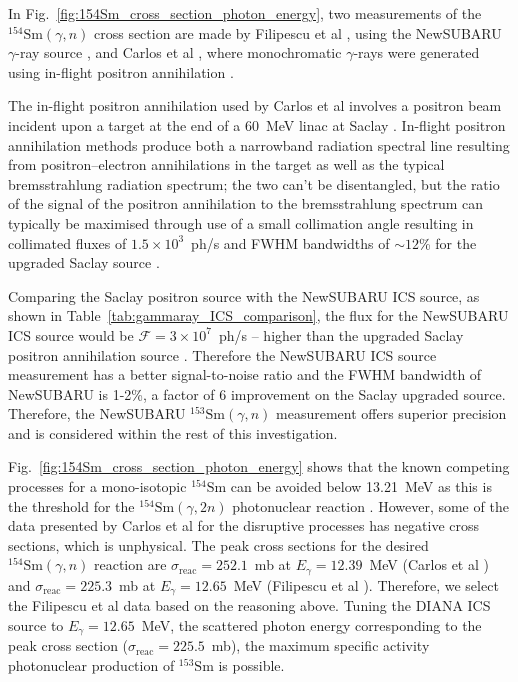\documentclass[../main.tex]{subfiles}
\begin{document}
In Fig.~\ref{fig:154Sm_cross_section_photon_energy}, two measurements of the $^{154}\mathrm{Sm}\left(\gamma,n\right)$ cross section are made by Filipescu et al \cite{filipescu2014photoneutron}, using the NewSUBARU $\gamma$-ray source \cite{utsunomiya2015gamma}, and Carlos et al \cite{carlos1974giant}, where monochromatic $\gamma$-rays were generated using in-flight positron annihilation \cite{miller1960monochromatic}.

The in-flight positron annihilation used by Carlos et al involves a positron beam incident upon a target at the end of a 60~\si{\mega\electronvolt} linac at Saclay \cite{audit1970etude}. In-flight positron annihilation methods produce both a narrowband radiation spectral line resulting from positron--electron annihilations in the target as well as the typical bremsstrahlung radiation spectrum; the two can't be disentangled, but the ratio of the signal of the positron annihilation to the bremsstrahlung spectrum can typically be maximised through use of a small collimation angle resulting in collimated fluxes of $1.5\times10^{3}$~ph/\si{\second} and FWHM bandwidths of $\sim 12$\% for the upgraded Saclay source \cite{veyssiere1979quasi}.

Comparing the Saclay positron source with the NewSUBARU ICS source, as shown in Table~\ref{tab:gammaray_ICS_comparison}, the flux for the NewSUBARU ICS source would be $\mathcal{F}=3\times 10^{7}$~ph/\si{\second} -- higher than the upgraded Saclay positron annihilation source \cite{veyssiere1979quasi}. Therefore the NewSUBARU ICS source measurement has a better signal-to-noise ratio and the FWHM bandwidth of NewSUBARU is 1-2\%, a factor of 6 improvement on the Saclay upgraded source. Therefore, the NewSUBARU $^{153}\mathrm{Sm}\left(\gamma,n\right)$ measurement offers superior precision and is considered within the rest of this investigation.  

Fig.~\ref{fig:154Sm_cross_section_photon_energy} shows that the known competing processes for a mono-isotopic $^{154}\mathrm{Sm}$ can be avoided below 13.21~\si{\mega\electronvolt} as this is the threshold for the $^{154}\mathrm{Sm}\left(\gamma,2n\right)$ photonuclear reaction \cite{carlos1974giant}. However, some of the data presented by Carlos et al \cite{carlos1974giant} for the disruptive processes has negative cross sections, which is unphysical. The peak cross sections for the desired $^{154}\mathrm{Sm}\left(\gamma,n\right)$ reaction are $\sigma_{\mathrm{reac}} = 252.1$~\si{\milli\barn} at $E_{\gamma} = 12.39$~\si{\mega\electronvolt} (Carlos et al \cite{carlos1974giant}) and $\sigma_{\mathrm{reac}} = 225.3$~\si{\milli\barn} at $E_{\gamma} = 12.65$~\si{\mega\electronvolt} (Filipescu et al \cite{filipescu2014photoneutron}). Therefore, we select the Filipescu et al \cite{filipescu2014photoneutron} data based on the reasoning above. Tuning the DIANA ICS source to $E_{\gamma}=12.65$~\si{\mega\electronvolt}, the scattered photon energy  corresponding to the peak cross section ($\sigma_{\mathrm{reac}}=225.5$~\si{\milli\barn}), the maximum specific activity photonuclear production of $^{153}\mathrm{Sm}$ is possible.
\end{document}
